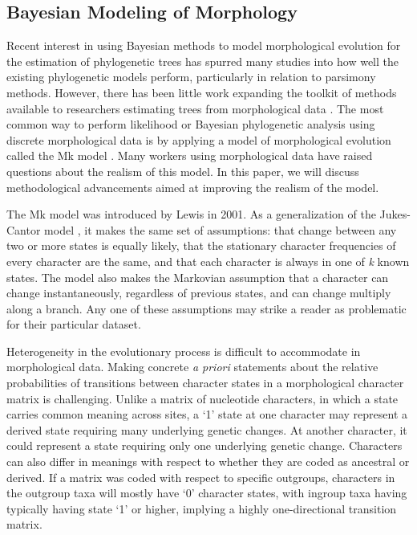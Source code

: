 \documentclass[]{sysbio}
\begin{document}
\subsection{Bayesian Modeling of Morphology}
	Recent interest in using Bayesian methods to model morphological evolution for the estimation of phylogenetic trees has spurred many studies into how well the existing phylogenetic models perform, particularly in relation to parsimony methods.
	However, there has been little work expanding the toolkit of methods available to researchers estimating trees from morphological data \citep{parins2017, dosreis2018, Alvarez-Carretero441105}. 
	The most common way to perform likelihood or Bayesian phylogenetic analysis using discrete morphological data is by applying a model of morphological evolution called the Mk model \citep{lewis2001}.
	Many workers using morphological data have raised questions about the realism of this model.
	In this paper, we will discuss methodological advancements aimed at improving the realism of the model. \par
	The Mk model was introduced by Lewis in 2001.
	As a generalization of the Jukes-Cantor model \citep{Jukes1969}, it makes the same set of assumptions: that change between any two or more states  is equally likely, that the stationary character frequencies of every character are the same, and that each character is always in one of \textit{k} known states.
	The model also makes the Markovian assumption that a character can change instantaneously, regardless of previous states, and can change multiply along a branch. 
	Any one of these assumptions may strike a reader as problematic for their particular dataset. \par
	Heterogeneity in the evolutionary process is difficult to accommodate in morphological data. 
	Making concrete \textit{a priori} statements about the relative probabilities of transitions between character states in a morphological character matrix is challenging. 
	Unlike a matrix of nucleotide characters, in which a state carries common meaning across sites, a `1' state at one character may represent a derived state requiring many underlying genetic changes.
	At another character, it could represent a state requiring only one underlying genetic change.
	Characters can also differ in meanings with respect to whether they are coded as ancestral or derived.
	If a matrix was coded with respect to specific outgroups, characters in the outgroup taxa will mostly have `0' character states, with ingroup taxa having typically having state `1' or higher, implying a highly one-directional transition matrix.
\end{document}
